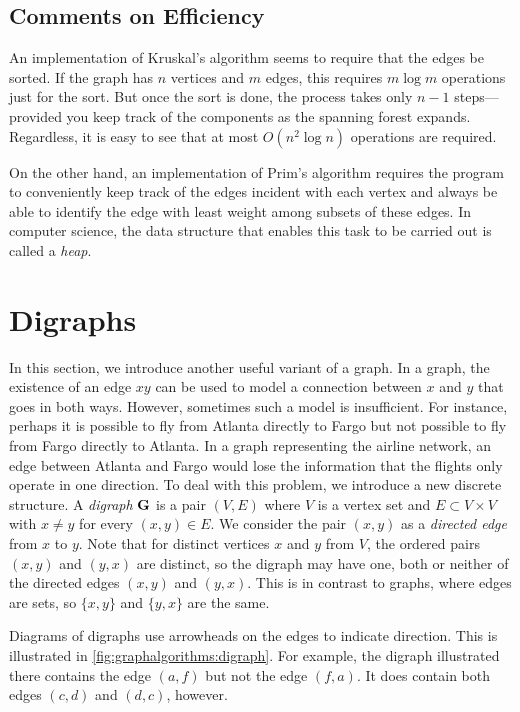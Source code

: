 \subsection{Comments on Efficiency}

An implementation of Kruskal's algorithm seems to require that
the edges be sorted.  If the graph has $n$ vertices and $m$  edges,
this requires $m\log m$ operations just for the sort.  But once
the sort is done, the process takes only $n-1$ steps---provided
you keep track of the components as the spanning forest expands.
Regardless, it is easy to see that at most $O(n^2\log n)$ operations
are required.

On the other hand, an implementation of Prim's algorithm requires
the program to conveniently keep track of the edges incident with
each vertex and always be able to identify the edge with least
weight among subsets of these edges.  In computer science, the
data structure that enables this task to be carried out is called
a \textit{heap}.

\section{Digraphs}\label{s:graphalgorithms:digraphs}

In this section, we introduce another useful variant of a graph. In a
graph, the existence of an edge $xy$ can be used to model a connection
between $x$ and $y$ that goes in both ways. However, sometimes such a
model is insufficient. For instance, perhaps it is possible to fly
from Atlanta directly to Fargo but not possible to fly from Fargo
directly to Atlanta. In a graph representing the airline network, an
edge between Atlanta and Fargo would lose the information that the
flights only operate in one direction. To deal with this problem, we
introduce a new discrete structure. A \textit{digraph} $\mathbf{G}$ is a
pair $(V,E)$ where $V$ is a vertex set and $E\subset V\times V$ with
$x\neq y$ for every $(x,y)\in E$.  We consider the pair $(x,y)$ as a
\textit{directed edge} from $x$ to $y$.  Note that for distinct
vertices $x$ and $y$ from $V$, the ordered pairs $(x,y)$ and $(y,x)$
are distinct, so the digraph may have one, both or neither of the
directed edges $(x,y)$ and $(y,x)$. This is in contrast to graphs,
where edges are sets, so $\{x,y\}$ and $\{y,x\}$ are the same.

Diagrams of digraphs use arrowheads on the edges to indicate direction.
This is illustrated in \autoref{fig:graphalgorithms:digraph}. For
example, the digraph illustrated there contains the edge $(a,f)$ but
not the edge $(f,a)$. It does contain both edges $(c,d)$ and $(d,c)$,
however.

